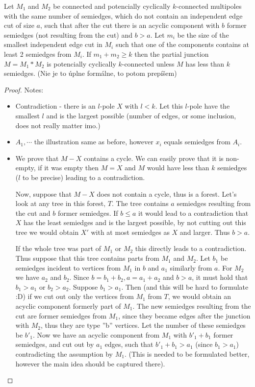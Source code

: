 \documentclass[12pt, twoside]{book}
\begin{document}
\begin{theorem}\label{th:connecting-potencially-k-connected}
	Let $M_1$ and $M_2$ be connected and potencially cyclically $k$-connected multipoles with the same number of semiedges, which do not contain an independent edge cut of size $a$, such that after the cut there is an acyclic component with $b$ former semiedges (not resulting from the cut) and $b>a$. Let $m_i$ be the size of the smallest independent edge cut in $M_i$ such that one of the components contains at least 2 semiedges from $M_i$. If $m_1+m_2\geq k$ then the partial junction $M=M_1*M_2$ is potencially cyclically $k$-connected unless $M$ has less than $k$ semiedges. (Nie je to úplne formálne, to potom prepíšem)
\end{theorem}

\begin{proof}
	Notes:
	\begin{itemize}
		\item Contradiction - there is an $l$-pole $X$ with $l<k$. Let this $l$-pole have the smallest $l$ and is the largest possible (number of edges, or some inclusion, does not really matter imo.)
		\item $A_1,\cdots$ the illustration same as before, however $x_i$ equals semiedges from $A_i$.
		\item We prove that $M-X$ contains a cycle. We can easily prove that it is non-empty, if it was empty then $M=X$ and $M$ would have less than $k$ semiedges ($l$ to be precise) leading to a contradiction.
		
		Now, suppose that $M-X$ does not contain a cycle, thus is a forest. Let's look at any tree in this forest, $T$. The tree contains $a$ semiedges resulting from the cut and $b$ former semiedges. If $b\leq a$ it would lead to a contradiction that $X$ has the least semiedges and is the largest possible, by not cutting out this tree we would obtain $X'$ with at most semiedges as $X$ and larger. Thus $b>a$. 
		
		If the whole tree was part of $M_1$ or $M_2$ this directly leads to a contradiction. Thus suppose that this tree contains parts from $M_1$ and $M_2$. Let $b_1$ be semiedges incident to vertices from $M_1$ in $b$ and $a_1$ similarly from $a$. For $M_2$ we have $a_2$ and $b_2$. Since $b=b_1+b_2, a=a_1+a_2$ and $b>a$, it must hold that $b_1>a_1$ or $b_2>a_2$. Suppose $b_1>a_1$. Then (and this will be hard to formulate :D) if we cut out only the vertices from $M_1$ from $T$, we would obtain an acyclic component formerly part of $M_1$. The new semiedges resulting from the cut are former semiedges from $M_1$, since they became edges after the junction with $M_2$, thus they are type ''b'' vertices. Let the number of these semiedges be $b'_1$. Now we have an acyclic component from $M_1$ with $b'_1+b_1$ former semiedges, and cut out by $a_1$ edges, such that $b'_1+b_1>a_1$ (since $b_1>a_1$) contradicting the assumption by $M_1$. (This is needed to be formulated better, however the main idea should be captured there).
		

\end{itemize}
\end{proof}
\end{document}
